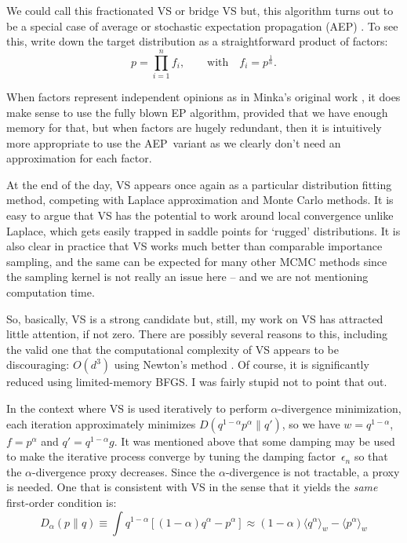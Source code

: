\documentclass{article}
\begin{document}
We could call this fractionated VS or bridge VS but, this algorithm turns out to be a special case of average or stochastic expectation propagation (AEP) \cite{Dehaene-18,Li-15}. To see this, write down the target distribution as a straightforward product of factors:
$$
p = \prod_{i=1}^n f_i,
\qquad\text{with}\quad
f_i = p^\frac{1}{n}.
$$

When factors represent independent opinions as in Minka's original work \cite{Minka-05}, it does make sense to use the fully blown EP algorithm, provided that we have enough memory for that, but when factors are hugely redundant, then it is intuitively more appropriate to use the AEP~variant as we clearly don't need an approximation for each factor.

At the end of the day, VS appears once again as a particular distribution fitting method, competing with Laplace approximation and Monte Carlo methods. It is easy to argue that VS has the potential to work around local convergence unlike Laplace, which gets easily trapped in saddle points for `rugged' distributions. It is also clear in practice that VS works much better than comparable importance sampling, and the same can be expected for many other MCMC methods since the sampling kernel is not really an issue here -- and we are not mentioning computation time. 

So, basically, VS is a strong candidate but, still, my work on VS has attracted little attention, if not zero. There are possibly several reasons to this, including the valid one that the computational complexity of VS appears to be discouraging: $O(d^3)$ using Newton's method \cite{rr:16}. Of course, it is significantly reduced using limited-memory BFGS. I was fairly stupid not to point that out.


In the context where VS is used iteratively to perform $\alpha$-divergence minimization, each iteration approximately minimizes $D(q^{1-\alpha}p^\alpha\|q')$, so we have $w=q^{1-\alpha}$, $f=p^\alpha$ and $q'=q^{1-\alpha}g$. It was mentioned above that some damping may be used to make the iterative process converge by tuning the damping factor~$\epsilon_n$ so that the $\alpha$-divergence proxy decreases. Since the $\alpha$-divergence is not tractable, a proxy is needed. One that is consistent with VS in the sense that it yields the {\em same} first-order condition is:
$$
D_\alpha (p\|q) 
\equiv 
\int q^{1-\alpha} [(1-\alpha)q^\alpha - p^\alpha]
\approx 
(1-\alpha)\langle q^\alpha \rangle_w - \langle p^\alpha \rangle_w
$$
\end{document}

